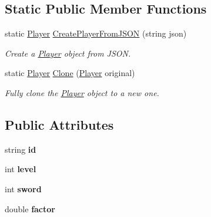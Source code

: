 \subsection*{Static Public Member Functions}
\begin{DoxyCompactItemize}
\item 
\mbox{\label{class_player_a9278b5c20dc0e3b2cab022cccacac63c}} 
static \mbox{\hyperlink{class_player}{Player}} \mbox{\hyperlink{class_player_a9278b5c20dc0e3b2cab022cccacac63c}{Create\+Player\+From\+J\+S\+ON}} (string json)
\begin{DoxyCompactList}\small\item\em Create a \mbox{\hyperlink{class_player}{Player}} object from J\+S\+ON. \end{DoxyCompactList}\item 
\mbox{\label{class_player_adf965ae02f9b21712dcd93b8a2f955f4}} 
static \mbox{\hyperlink{class_player}{Player}} \mbox{\hyperlink{class_player_adf965ae02f9b21712dcd93b8a2f955f4}{Clone}} (\mbox{\hyperlink{class_player}{Player}} original)
\begin{DoxyCompactList}\small\item\em Fully clone the \mbox{\hyperlink{class_player}{Player}} object to a new one. \end{DoxyCompactList}\end{DoxyCompactItemize}
\subsection*{Public Attributes}
\begin{DoxyCompactItemize}
\item 
\mbox{\label{class_player_a4133cf7ecb22b0ae16ee457c46eacc08}} 
string {\bfseries id}
\item 
\mbox{\label{class_player_a400a72423db730ee29977227c4860cfd}} 
int {\bfseries level}
\item 
\mbox{\label{class_player_aa6c1d9c5753ea9a365f28eac36238d1f}} 
int {\bfseries sword}
\item 
\mbox{\label{class_player_a1d8f77afde9a68f34917561d915a5656}} 
double {\bfseries factor}
\end{DoxyCompactItemize}
